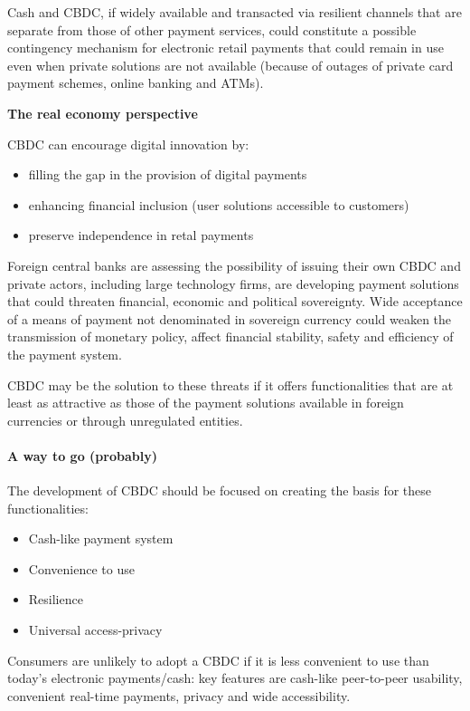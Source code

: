 Cash and CBDC, if widely available and transacted via resilient channels that are separate from those of other payment services, could constitute a possible contingency mechanism for electronic retail payments that could remain in use even when private solutions are not available (because of outages of private card payment schemes, online banking and ATMs).

\textbf{The real economy perspective}

CBDC can encourage digital innovation by:
\begin{itemize}
    \item filling the gap in the provision of digital payments
    \item enhancing financial inclusion (user solutions accessible to customers)
    \item preserve independence in retal payments
\end{itemize}

Foreign central banks are assessing the possibility of issuing their own CBDC and private actors, including large technology firms, are developing payment solutions that could threaten financial, economic and political sovereignty. Wide acceptance of a means of payment not denominated in sovereign currency could weaken the transmission of monetary policy, affect financial stability, safety and efficiency of the payment system.

CBDC may be the solution to these threats if it offers functionalities that are at least as attractive as those of the payment solutions available in foreign currencies or through unregulated entities.

\paragraph{A way to go (probably)}

The development of CBDC should be focused on creating the basis for these functionalities:
\begin{itemize}
    \item Cash-like payment system
    \item Convenience to use
    \item Resilience
    \item Universal access-privacy
\end{itemize}

Consumers are unlikely to adopt a CBDC if it is less convenient to use than today's electronic payments/cash: key features are cash-like peer-to-peer usability, convenient real-time payments, privacy and wide accessibility.

